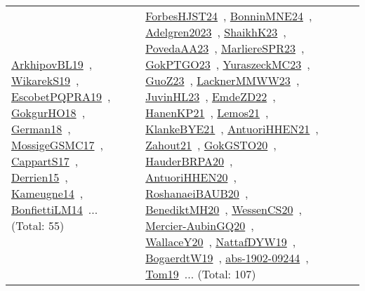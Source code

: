 {\begin{longtable}{lp{3cm}>{\raggedright\arraybackslash}p{6cm}>{\raggedright\arraybackslash}p{6cm}>{\raggedright\arraybackslash}p{8cm}}
\href{../works/ArkhipovBL19.pdf}{ArkhipovBL19}~\cite{ArkhipovBL19}, \href{../works/WikarekS19.pdf}{WikarekS19}~\cite{WikarekS19}, \href{../works/EscobetPQPRA19.pdf}{EscobetPQPRA19}~\cite{EscobetPQPRA19}, \href{../works/GokgurHO18.pdf}{GokgurHO18}~\cite{GokgurHO18}, \href{../works/German18.pdf}{German18}~\cite{German18}, \href{../works/MossigeGSMC17.pdf}{MossigeGSMC17}~\cite{MossigeGSMC17}, \href{../works/CappartS17.pdf}{CappartS17}~\cite{CappartS17}, \href{../works/Derrien15.pdf}{Derrien15}~\cite{Derrien15}, \href{../works/Kameugne14.pdf}{Kameugne14}~\cite{Kameugne14}, \href{../works/BonfiettiLM14.pdf}{BonfiettiLM14}~\cite{BonfiettiLM14}... (Total: 55) & \href{../works/ForbesHJST24.pdf}{ForbesHJST24}~\cite{ForbesHJST24}, \href{../works/BonninMNE24.pdf}{BonninMNE24}~\cite{BonninMNE24}, \href{../works/Adelgren2023.pdf}{Adelgren2023}~\cite{Adelgren2023}, \href{../works/ShaikhK23.pdf}{ShaikhK23}~\cite{ShaikhK23}, \href{../works/PovedaAA23.pdf}{PovedaAA23}~\cite{PovedaAA23}, \href{../works/MarliereSPR23.pdf}{MarliereSPR23}~\cite{MarliereSPR23}, \href{../works/GokPTGO23.pdf}{GokPTGO23}~\cite{GokPTGO23}, \href{../works/YuraszeckMC23.pdf}{YuraszeckMC23}~\cite{YuraszeckMC23}, \href{../works/GuoZ23.pdf}{GuoZ23}~\cite{GuoZ23}, \href{../works/LacknerMMWW23.pdf}{LacknerMMWW23}~\cite{LacknerMMWW23}, \href{../works/JuvinHL23.pdf}{JuvinHL23}~\cite{JuvinHL23}, \href{../works/EmdeZD22.pdf}{EmdeZD22}~\cite{EmdeZD22}, \href{../works/HanenKP21.pdf}{HanenKP21}~\cite{HanenKP21}, \href{../works/Lemos21.pdf}{Lemos21}~\cite{Lemos21}, \href{../works/KlankeBYE21.pdf}{KlankeBYE21}~\cite{KlankeBYE21}, \href{../works/AntuoriHHEN21.pdf}{AntuoriHHEN21}~\cite{AntuoriHHEN21}, \href{../works/Zahout21.pdf}{Zahout21}~\cite{Zahout21}, \href{../works/GokGSTO20.pdf}{GokGSTO20}~\cite{GokGSTO20}, \href{../works/HauderBRPA20.pdf}{HauderBRPA20}~\cite{HauderBRPA20}, \href{../works/AntuoriHHEN20.pdf}{AntuoriHHEN20}~\cite{AntuoriHHEN20}, \href{../works/RoshanaeiBAUB20.pdf}{RoshanaeiBAUB20}~\cite{RoshanaeiBAUB20}, \href{../works/BenediktMH20.pdf}{BenediktMH20}~\cite{BenediktMH20}, \href{../works/WessenCS20.pdf}{WessenCS20}~\cite{WessenCS20}, \href{../works/Mercier-AubinGQ20.pdf}{Mercier-AubinGQ20}~\cite{Mercier-AubinGQ20}, \href{../works/WallaceY20.pdf}{WallaceY20}~\cite{WallaceY20}, \href{../works/NattafDYW19.pdf}{NattafDYW19}~\cite{NattafDYW19}, \href{../works/BogaerdtW19.pdf}{BogaerdtW19}~\cite{BogaerdtW19}, \href{../works/abs-1902-09244.pdf}{abs-1902-09244}~\cite{abs-1902-09244}, \href{../works/Tom19.pdf}{Tom19}~\cite{Tom19}... (Total: 107)\\

\end{longtable}}
